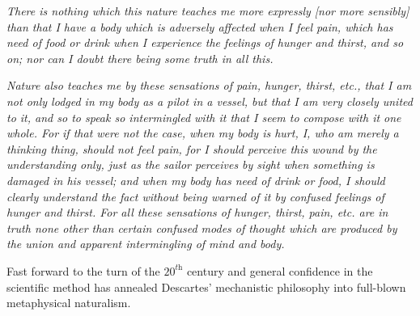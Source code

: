 \begin{tcolorbox}[breakable, enhanced, colback=textbook-blue, sharp corners]
	\begin{displayquote}
		\textit{There is nothing which this nature teaches me more expressly [nor more sensibly] than that I have a body which is adversely affected when I feel pain, which has need of food or drink when I experience the feelings of hunger and thirst, and so on; nor can I doubt there being some truth in all this. \\}
		
		\textit{Nature also teaches me by these sensations of pain, hunger, thirst, etc., that I am not only lodged in my body as a pilot in a vessel, but that I am very closely united to it, and so to speak so intermingled with it that I seem to compose with it one whole. For if that were not the case, when my body is hurt, I, who am merely a thinking thing, should not feel pain, for I should perceive this wound by the understanding only, just as the sailor perceives by sight when something is damaged in his vessel; and when my body has need of drink or food, I should clearly understand the fact without being warned of it by confused feelings of hunger and thirst. For all these sensations of hunger, thirst, pain, etc. are in truth none other than certain confused modes of thought which are produced by the union and apparent intermingling of mind and body. \\}
	\end{displayquote}
	
	Fast forward to the turn of the $20^\textit{th}$ century and general confidence in the scientific method has annealed Descartes' mechanistic philosophy into full-blown metaphysical naturalism.
	
	
	
	

\end{tcolorbox}
